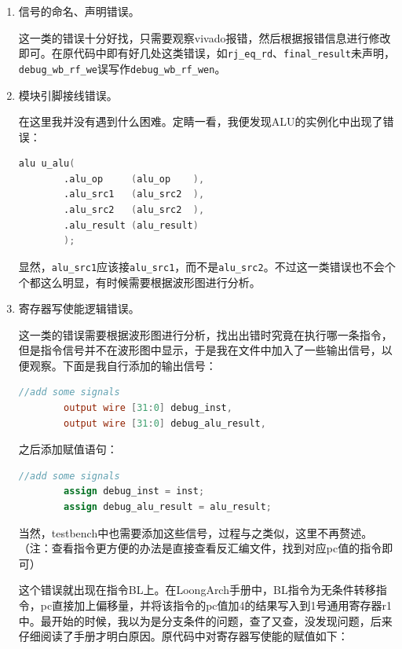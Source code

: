 \documentclass[UTF8]{article}
\begin{document}
\begin{enumerate}
    \item 信号的命名、声明错误。
    
    这一类的错误十分好找，只需要观察vivado报错，然后根据报错信息进行修改即可。在原代码中即有好几处这类错误，如\texttt{rj\_eq\_rd}、\texttt{final\_result}未声明，\texttt{debug\_wb\_rf\_we}误写作\texttt{debug\_wb\_rf\_wen}。

    \item 模块引脚接线错误。
    
    在这里我并没有遇到什么困难。定睛一看，我便发现ALU的实例化中出现了错误：

    \begin{lstlisting}[language=Verilog]
        alu u_alu(
        .alu_op     (alu_op    ),
        .alu_src1   (alu_src2  ),
        .alu_src2   (alu_src2  ),
        .alu_result (alu_result)
        );
    \end{lstlisting}

    显然，\texttt{alu\_src1}应该接\texttt{alu\_src1}，而不是\texttt{alu\_src2}。不过这一类错误也不会个个都这么明显，有时候需要根据波形图进行分析。

    \item 寄存器写使能逻辑错误。
    
    这一类的错误需要根据波形图进行分析，找出出错时究竟在执行哪一条指令，但是指令信号并不在波形图中显示，于是我在文件中加入了一些输出信号，以便观察。下面是我自行添加的输出信号：

    \begin{lstlisting}[language=Verilog]
        //add some signals
        output wire [31:0] debug_inst,
        output wire [31:0] debug_alu_result,
    \end{lstlisting}

    之后添加赋值语句：

    \begin{lstlisting}[language=Verilog]
        //add some signals
        assign debug_inst = inst;
        assign debug_alu_result = alu_result;
    \end{lstlisting}

    当然，testbench中也需要添加这些信号，过程与之类似，这里不再赘述。（注：查看指令更方便的办法是直接查看反汇编文件，找到对应pc值的指令即可）

    这个错误就出现在指令BL上。在LoongArch手册中，BL指令为无条件转移指令，pc直接加上偏移量，并将该指令的pc值加4的结果写入到1号通用寄存器r1中。最开始的时候，我以为是分支条件的问题，查了又查，没发现问题，后来仔细阅读了手册才明白原因。原代码中对寄存器写使能的赋值如下：


\end{enumerate}
\end{document}
